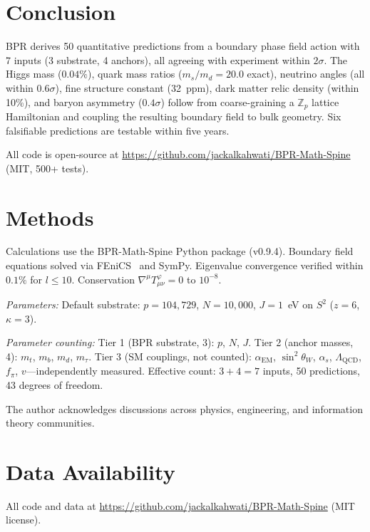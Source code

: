 \documentclass[prd,twocolumn,amsmath,amssymb]{revtex4-2}
\begin{document}
\section{Conclusion}
\label{sec:conclusion}

BPR derives 50 quantitative predictions from a boundary phase field action with 7 inputs (3 substrate, 4 anchors), all agreeing with experiment within $2\sigma$. The Higgs mass ($0.04\%$), quark mass ratios ($m_s/m_d = 20.0$ exact), neutrino angles (all within $0.6\sigma$), fine structure constant (32~ppm), dark matter relic density (within 10\%), and baryon asymmetry ($0.4\sigma$) follow from coarse-graining a $\mathbb{Z}_p$ lattice Hamiltonian and coupling the resulting boundary field to bulk geometry. Six falsifiable predictions are testable within five years.

All code is open-source at \href{https://github.com/jackalkahwati/BPR-Math-Spine}{https://github.com/jackalkahwati/BPR-Math-Spine} (MIT, 500+ tests).

\section*{Methods}
\label{sec:methods}

Calculations use the BPR-Math-Spine Python package (v0.9.4). Boundary field equations solved via FEniCS~\cite{Logg2012} and SymPy. Eigenvalue convergence verified within $0.1\%$ for $l \le 10$. Conservation $\nabla^\mu T^\varphi_{\mu\nu} = 0$ to $10^{-8}$.

\textit{Parameters:} Default substrate: $p = 104{,}729$, $N = 10{,}000$, $J = 1$~eV on $S^2$ ($z = 6$, $\kappa = 3$).

\textit{Parameter counting:} Tier 1 (BPR substrate, 3): $p$, $N$, $J$. Tier 2 (anchor masses, 4): $m_t$, $m_b$, $m_d$, $m_\tau$. Tier 3 (SM couplings, not counted): $\alpha_{\mathrm{EM}}$, $\sin^2\theta_W$, $\alpha_s$, $\Lambda_{\mathrm{QCD}}$, $f_\pi$, $v$---independently measured. Effective count: $3 + 4 = 7$ inputs, 50 predictions, 43 degrees of freedom.

\acknowledgments
The author acknowledges discussions across physics, engineering, and information theory communities.

\section*{Data Availability}
All code and data at \href{https://github.com/jackalkahwati/BPR-Math-Spine}{https://github.com/jackalkahwati/BPR-Math-Spine} (MIT license).
\end{document}
